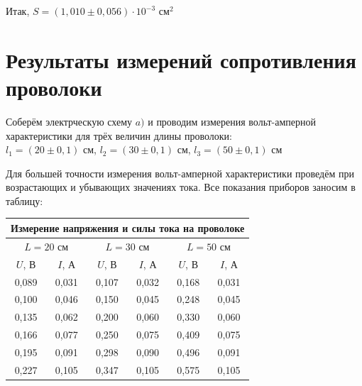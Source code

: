 Итак, $S = (1,010 \pm 0,056)\cdot10^{-3} \text{ см}^{2}$

\section{Результаты измерений сопротивления проволоки}

Соберём электрческую схему $a)$ и проводим измерения вольт-амперной характеристики для трёх величин длины проволоки:\\ $l_1=(20\pm 0,1)$ см, $l_2=(30\pm 0,1)$ см, $l_3=(50\pm 0,1)$ см

Для большей точности измерения вольт-амперной характеристики проведём при возрастающих и убывающих значениях тока. Все показания приборов заносим в таблицу:

\begin{center}
    \begin{tabular}{|c|c|c|c|c|c|}
        \hline
        \multicolumn{6}{|c|}{Измерение напряжения и силы тока на проволоке}                                                                  \\ \hline
        \multicolumn{2}{|c|}{$L = 20$ см} & \multicolumn{2}{|c|}{$L = 30$ см} & \multicolumn{2}{|c|}{$L = 50$ см}                            \\ \hline
        $U$, В                            & $I$, А                            & $U$, В                            & $I$, А & $U$, В & $I$, А \\ \hline
        0,089                             & 0,031                             & 0,107                             & 0,032  & 0,168  & 0,031  \\ \hline
        0,100                             & 0,046                             & 0,150                             & 0,045  & 0,248  & 0,045  \\ \hline
        0,135                             & 0,062                             & 0,200                             & 0,060  & 0,330  & 0,060  \\ \hline
        0,166                             & 0,077                             & 0,250                             & 0,075  & 0,409  & 0,075  \\ \hline
        0,195                             & 0,091                             & 0,298                             & 0,090  & 0,496  & 0,091  \\ \hline
        0,227                             & 0,105                             & 0,347                             & 0,105  & 0,575  & 0,105  \\ \hline

\end{tabular}
\end{center}
